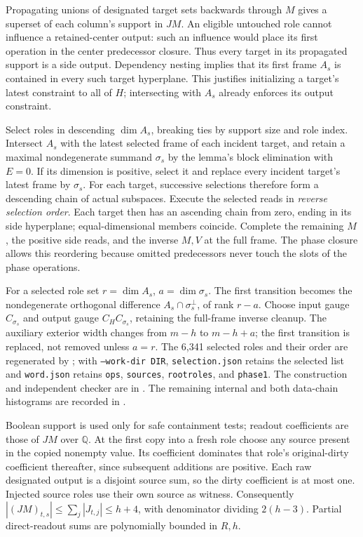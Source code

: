 Propagating unions of designated target sets backwards through $M$ gives
a superset of each column's support in $JM$. An eligible untouched role
cannot influence a retained-center output: such an influence would place
its first operation in the center predecessor closure. Thus every target
in its propagated support is a side output. Dependency nesting implies
that its first frame $A_s$ is contained in every such target hyperplane.
This justifies initializing a target's latest constraint to all of $H$;
intersecting with $A_s$ already enforces its output constraint.

Select roles in descending $\dim A_s$, breaking ties by support size and
role index. Intersect $A_s$ with the latest selected frame of each incident
target, and retain a maximal nondegenerate summand $\sigma_s$ by the lemma's
block elimination with $E=0$. If its dimension is positive, select it and
replace every incident target's latest frame by $\sigma_s$.
For each target, successive selections therefore form a descending chain
of actual subspaces. Execute the selected reads in \emph{reverse selection
order}. Each target then has an ascending chain from zero, ending in its
side hyperplane; equal-dimensional members coincide. Complete the remaining
$M$, the positive side reads, and the inverse $M,V$ at the full frame.
The phase closure allows this reordering because omitted predecessors
never touch the slots of the phase operations.

For a selected role set $r=\dim A_s$, $a=\dim\sigma_s$.
The first transition becomes the nondegenerate orthogonal difference
$A_s\cap\sigma_s^\perp$, of rank $r-a$. Choose input gauge $C_{\sigma_s}$
and output gauge $C_HC_{\sigma_s}$, retaining the full-frame inverse
cleanup. The auxiliary exterior width changes from $m-h$ to $m-h+a$;
the first transition is replaced, not removed unless $a=r$.
The 6,341 selected roles and their order are regenerated by
; with \texttt{--work-dir DIR},
\texttt{selection.json} retains the selected list and \texttt{word.json}
retains \texttt{ops}, \texttt{sources}, \texttt{rootroles}, and
\texttt{phase1}. The construction and independent checker are in
. The remaining internal and both data-chain
histograms are recorded in
.

Boolean support is used only for safe containment tests; readout
coefficients are those of $JM$ over $\mathbb Q$. At the first copy into a
fresh role choose any source present in the copied nonempty value. Its
coefficient dominates that role's original-dirty coefficient thereafter,
since subsequent additions are positive. Each raw designated output is
a disjoint source sum, so the dirty coefficient is at most one.
Injected source roles use their own source as witness. Consequently
$|(JM)_{t,s}|\le\sum_j|J_{t,j}|\le h+4$, with denominator dividing
$2(h-3)$. Partial direct-readout sums are polynomially bounded in $R,h$.
